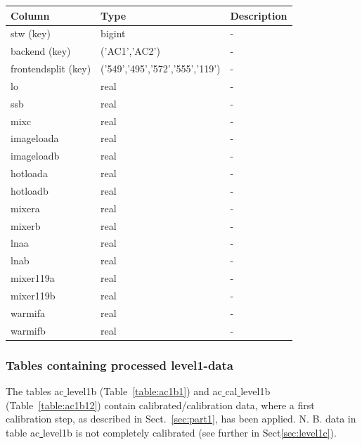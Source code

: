 \documentclass[12pt]{article}
\begin{document}
\begin{table}
\begin{tiny}
\begin{subtable}{.9\linewidth}
        \begin{tabular}{l l l}
\hline\hline
Column & Type & Description \\ [0.5ex]
\hline
 stw (key)       & bigint           & - \\
 backend (key)   & ('AC1','AC2')    & -\\ 
 frontendsplit (key) & ('549','495','572','555','119') & -\\
 lo         & real             & -\\ 
 ssb        & real             & -\\ 
 mixc       & real             & -\\  
 imageloada & real             & -\\
 imageloadb & real             & -\\
 hotloada   & real             & -\\ 
 hotloadb   & real             & -\\
 mixera     & real             & -\\
 mixerb     & real             & -\\
 lnaa       & real             & -\\
 lnab       & real             & -\\
 mixer119a  & real             & -\\
 mixer119b  & real             & -\\
 warmifa    & real             & -\\
 warmifb    & real             & -\\[1ex]
\hline
\end{tabular}

       
    \end{subtable}%
 

 \end{tiny}
\end{table}




\clearpage
\newpage

\subsubsection{Tables containing processed level1-data}
The tables ac\underline{ }level1b (Table~\ref{table:ac1b1})
 and ac\underline{ }cal\underline{ }level1b (Table~\ref{table:ac1b12})
contain calibrated/calibration data, where a first calibration step,
as described in Sect.~\ref{sec:part1}, has been applied.
N. B. data in table ac\underline{ }level1b is not completely calibrated
(see further in Sect\ref{sec:level1c}).
 
\end{document}
